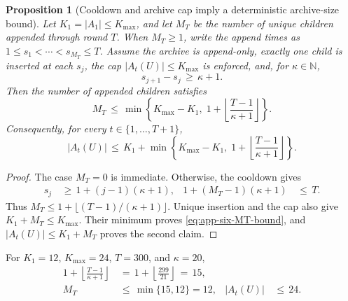 \documentclass{article} %
\newtheorem{proposition}[theorem]{Proposition}
\begin{document}
\begin{proposition}[Cooldown and archive cap imply a deterministic archive-size bound]
\label{prop:15}
Let \(K_1=|A_1|\leq K_{\max}\), and let \(M_T\) be the number of unique
children appended through round \(T\). When \(M_T\geq1\), write the append
times as \(1\leq s_1<\cdots<s_{M_T}\leq T\). Assume the archive is append-only,
exactly one child is inserted at each \(s_j\), the cap
\(|A_t(U)|\leq K_{\max}\) is enforced, and, for \(\kappa\in\mathbb N\),
\begin{equation}
\label{eq:app-six-cooldown-condition}
s_{j+1}-s_j\,\geq\,\kappa+1.
\end{equation}
Then the number of appended children satisfies
\begin{equation}
\label{eq:app-six-MT-bound}
M_T
\,\le\,
\min\!\left\{
K_{\max}-K_1,\;
1+\left\lfloor\frac{T-1}{\kappa+1}\right\rfloor
\right\}.
\end{equation}
Consequently, for every \(t\in\{1,\ldots,T+1\}\),
\begin{equation}
\label{eq:app-six-archive-size-bound}
|A_t(U)|
\,\le\,
K_1+
\min\!\left\{
K_{\max}-K_1,\;
1+\left\lfloor\frac{T-1}{\kappa+1}\right\rfloor
\right\}.
\end{equation}
\end{proposition}

\begin{proof}
The case \(M_T=0\) is immediate. Otherwise, the cooldown gives
\begin{equation}
\begin{aligned}
s_j
&\,\ge\,
1+(j-1)(\kappa+1),
&
1+(M_T-1)(\kappa+1)
&\,\le\,
T.
\end{aligned}
\end{equation}
Thus \(M_T\leq1+\lfloor(T-1)/(\kappa+1)\rfloor\). Unique insertion and the
cap also give \(K_1+M_T\leq K_{\max}\). Their minimum proves
\eqref{eq:app-six-MT-bound}, and \(|A_t(U)|\leq K_1+M_T\) proves the second
claim.
\end{proof}

For \(K_1=12\), \(K_{\max}=24\), \(T=300\), and \(\kappa=20\),
\begin{equation}
\begin{aligned}
1+\left\lfloor\frac{T-1}{\kappa+1}\right\rfloor
&\,=\,
1+\left\lfloor\frac{299}{21}\right\rfloor
\,=\,15,
\\
M_T
&\,\leq\,
\min\{15,12\}=12,
&
|A_t(U)|
&\,\leq\,24.
\end{aligned}
\end{equation}
\end{document}

